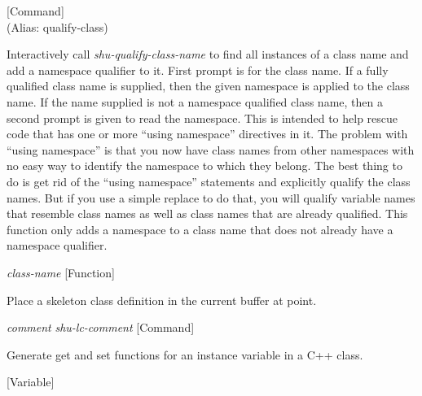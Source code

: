 \vspace{1em}
\noindent
{}
\usebox{\funcname}
 \hfill [Command]\\%
 (Alias: qualify-class)

\begin{doc-string}
Interactively call \emph{shu-qualify-class-name} to find all instances of a class name and
add a namespace qualifier to it.  First prompt is for the class name.  If a fully qualified
class name is supplied, then the given namespace is applied to the class name.  If the name
supplied is not a namespace qualified class name, then a second prompt is given to read the
namespace.
This is intended to help rescue code that has one or more ``using namespace''
directives in it.  The problem with ``using namespace'' is that you now have
class names from other namespaces with no easy way to identify the namespace
to which they belong.  The best thing to do is get rid of the ``using
namespace'' statements and explicitly qualify the class names.  But if you
use a simple replace to do that, you will qualify variable names that resemble
class names as well as class names that are already qualified.  This function
only adds a namespace to a class name that does not already have a namespace
qualifier.
\end{doc-string}

\vspace{1em}
\noindent
{}
\usebox{\funcname}\emph{class-name}
 \hfill [Function]

\begin{doc-string}
Place a skeleton class definition in the current buffer at point.
\end{doc-string}

\vspace{1em}
\noindent
{}
\usebox{\funcname}\emph{comment} \emph{shu-lc-comment}
 \hfill [Command]

\begin{doc-string}
Generate get and set functions for an instance variable in a C++ class.
\end{doc-string}

\vspace{1em}
\noindent
{}
\usebox{\funcname}
 \hfill [Variable]

